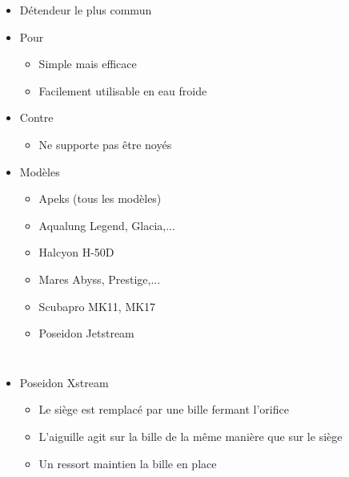\documentclass[aspectratio=1610,english,12pt]{beamer}
\begin{document}
\begin{frame}{\insertsubsubsection}
	\begin{itemize}
		\item Détendeur le plus commun
		\item Pour
		\begin{itemize}
			\item Simple mais efficace
			\item Facilement utilisable en eau froide
		\end{itemize}
		\item Contre
		\begin{itemize}
			\item Ne supporte pas être noyés
		\end{itemize}
	\end{itemize}
\end{frame}

\begin{frame}{\insertsubsubsection}
	\begin{itemize}
		\item Modèles
		\begin{itemize}
			\item Apeks (tous les modèles)
			\item Aqualung Legend, Glacia,...
			\item Halcyon H-50D
			\item Mares Abyss, Prestige,...
			\item Scubapro MK11, MK17
			\item Poseidon Jetstream
		\end{itemize}
	\end{itemize}
\end{frame}

\begin{frame}{\insertsubsubsection}
	\begin{columns}[onlytextwidth]
			\begin{itemize}
				\item Poseidon Xstream\\
				\begin{itemize}
					\item Le siège est remplacé par une bille fermant l'orifice
					\item L'aiguille agit sur la bille de la même manière que sur le siège
					\item Un ressort maintien la bille en place
				\end{itemize}
			\end{itemize}
	\end{columns}
\end{frame}
\end{document}
